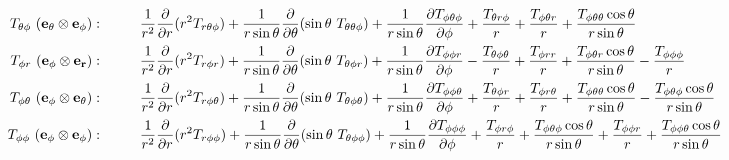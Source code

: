 \documentclass[10pt,paper=a4]{report}
\newcommand{\dr}{\frac{\partial}{\partial r}}
\begin{document}
\begin{align}
T_{\theta \phi} \ ({\bf{e_\theta \otimes e_\phi}}): & \hspace{1cm} \frac{1}{r^2}\dr (r^2 T_{r \theta \phi}) + \frac{1}{r\sin{\theta}}\frac{\partial}{\partial \theta} (\sin{\theta} \ T_{\theta \theta \phi}) + \frac{1}{r\sin{\theta}}\frac{\partial T_{\phi \theta \phi}}{\partial \phi} + \frac{T_{\theta r \phi}}{r} + \frac{T_{\phi \theta r}}{r} + \frac{T_{\phi \theta \theta} \cos{\theta}}{r\sin{\theta}} \\
T_{\phi r} \ ({\bf{e_\phi \otimes e_r}}): & \hspace{1cm} \frac{1}{r^2}\dr (r^2 T_{r \phi r}) + \frac{1}{r\sin{\theta}}\frac{\partial}{\partial \theta} (\sin{\theta} \ T_{\theta \phi r}) + \frac{1}{r\sin{\theta}}\frac{\partial T_{\phi \phi r}}{\partial \phi} - \frac{T_{\theta \phi \theta}}{r} + \frac{T_{\phi rr}}{r} + \frac{T_{\phi \theta r} \cos{\theta}}{r\sin{\theta}} - \frac{T_{\phi \phi \phi}}{r} \\
T_{\phi \theta} \ ({\bf{e_\phi \otimes e_\theta}}): & \hspace{1cm} \frac{1}{r^2}\dr (r^2 T_{r \phi \theta}) + \frac{1}{r\sin{\theta}}\frac{\partial}{\partial \theta} (\sin{\theta} \ T_{\theta \phi \theta}) + \frac{1}{r\sin{\theta}}\frac{\partial T_{\phi \phi \theta}}{\partial \phi} + \frac{T_{\theta \phi r}}{r} + \frac{T_{\phi r \theta}}{r} + \frac{T_{\phi \theta \theta} \cos{\theta}}{r\sin{\theta}} - \frac{T_{\phi \theta \phi} \cos{\theta}}{r\sin{\theta}}  \\
T_{\phi \phi} \ ({\bf{e_\phi \otimes e_\phi}}): & \hspace{1cm} \frac{1}{r^2}\dr (r^2 T_{r \phi \phi}) + \frac{1}{r\sin{\theta}}\frac{\partial}{\partial \theta} (\sin{\theta} \ T_{\theta \phi \phi}) + \frac{1}{r\sin{\theta}}\frac{\partial T_{\phi \phi \phi}}{\partial \phi} + \frac{T_{\phi r \phi}}{r} + \frac{T_{\phi \theta \phi} \cos{\theta}}{r\sin{\theta}} + \frac{T_{\phi \phi r}}{r} + \frac{T_{\phi \phi \theta} \cos{\theta}}{r\sin{\theta}}
\end{align}


\end{document}
